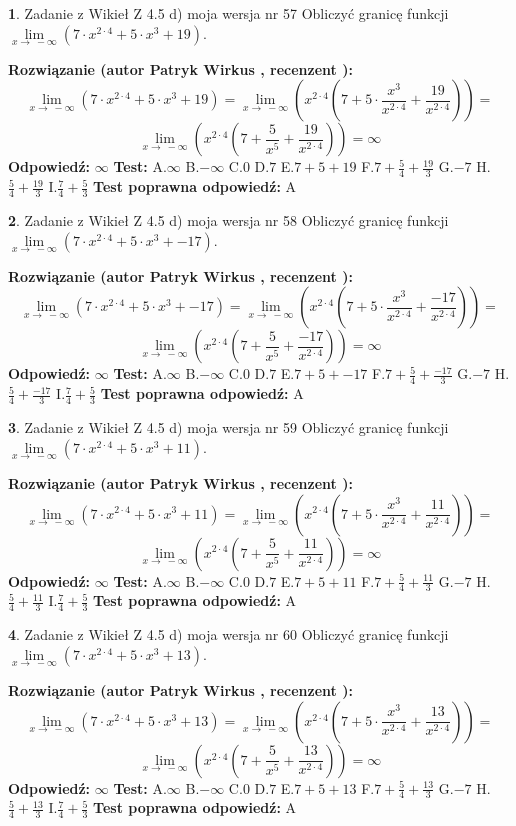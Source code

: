 \documentclass[12pt, a4paper]{article}
\theoremstyle{definition} %
\newtheorem{zad}{}
\newcommand{\zadStart}[1]{\begin{zad}#1\newline}
\newcommand{\zadStop}{\end{zad}}
\newcommand{\rozwStart}[2]{\noindent \textbf{Rozwiązanie (autor #1 , recenzent #2): }\newline}
\newcommand{\rozwStop}{\newline}
\newcommand{\odpStart}{\noindent \textbf{Odpowiedź:}\newline}
\newcommand{\odpStop}{\newline}
\newcommand{\testStart}{\noindent \textbf{Test:}\newline}
\newcommand{\testStop}{\newline}
\newcommand{\kluczStart}{\noindent \textbf{Test poprawna odpowiedź:}\newline}
\newcommand{\kluczStop}{\newline}
\begin{document}
\zadStart{Zadanie z Wikieł Z 4.5 d) moja wersja nr 57}
Obliczyć granicę funkcji  $\lim\limits_{x\to\ -\infty}(7 \cdot x^{2\cdot4}+5 \cdot x^{3}+19)$.
\zadStop
\rozwStart{Patryk Wirkus}{}
$$\lim\limits_{x\to\ -\infty}(7 \cdot x^{2\cdot4}+5 \cdot x^{3}+19) = \lim\limits_{x\to\ -\infty}(x^{2\cdot4}(7 +5 \cdot \frac{x^{3}}{x^{2\cdot4}}+\frac{19}{x^{2\cdot4}})) =$$ $$\lim\limits_{x\to\ -\infty}(x^{2\cdot4}(7 +\frac{5}{x^{5}}+\frac{19}{x^{2\cdot4}})) =\infty$$
\rozwStop
\odpStart
$\infty$
\odpStop
\testStart
A.$\infty$ B.$-\infty$ C.$0$ D.$7$ E.$7 + 5 + 19$
F.$7+\frac{5}{4}+\frac{19}{3}$ G.$-7$
H.$\frac{5}{4}+\frac{19}{3}$
I.$\frac{7}{4}+\frac{5}{3}$
\testStop
\kluczStart
A
\kluczStop



\zadStart{Zadanie z Wikieł Z 4.5 d) moja wersja nr 58}
Obliczyć granicę funkcji  $\lim\limits_{x\to\ -\infty}(7 \cdot x^{2\cdot4}+5 \cdot x^{3}+-17)$.
\zadStop
\rozwStart{Patryk Wirkus}{}
$$\lim\limits_{x\to\ -\infty}(7 \cdot x^{2\cdot4}+5 \cdot x^{3}+-17) = \lim\limits_{x\to\ -\infty}(x^{2\cdot4}(7 +5 \cdot \frac{x^{3}}{x^{2\cdot4}}+\frac{-17}{x^{2\cdot4}})) =$$ $$\lim\limits_{x\to\ -\infty}(x^{2\cdot4}(7 +\frac{5}{x^{5}}+\frac{-17}{x^{2\cdot4}})) =\infty$$
\rozwStop
\odpStart
$\infty$
\odpStop
\testStart
A.$\infty$ B.$-\infty$ C.$0$ D.$7$ E.$7 + 5 + -17$
F.$7+\frac{5}{4}+\frac{-17}{3}$ G.$-7$
H.$\frac{5}{4}+\frac{-17}{3}$
I.$\frac{7}{4}+\frac{5}{3}$
\testStop
\kluczStart
A
\kluczStop



\zadStart{Zadanie z Wikieł Z 4.5 d) moja wersja nr 59}
Obliczyć granicę funkcji  $\lim\limits_{x\to\ -\infty}(7 \cdot x^{2\cdot4}+5 \cdot x^{3}+11)$.
\zadStop
\rozwStart{Patryk Wirkus}{}
$$\lim\limits_{x\to\ -\infty}(7 \cdot x^{2\cdot4}+5 \cdot x^{3}+11) = \lim\limits_{x\to\ -\infty}(x^{2\cdot4}(7 +5 \cdot \frac{x^{3}}{x^{2\cdot4}}+\frac{11}{x^{2\cdot4}})) =$$ $$\lim\limits_{x\to\ -\infty}(x^{2\cdot4}(7 +\frac{5}{x^{5}}+\frac{11}{x^{2\cdot4}})) =\infty$$
\rozwStop
\odpStart
$\infty$
\odpStop
\testStart
A.$\infty$ B.$-\infty$ C.$0$ D.$7$ E.$7 + 5 + 11$
F.$7+\frac{5}{4}+\frac{11}{3}$ G.$-7$
H.$\frac{5}{4}+\frac{11}{3}$
I.$\frac{7}{4}+\frac{5}{3}$
\testStop
\kluczStart
A
\kluczStop



\zadStart{Zadanie z Wikieł Z 4.5 d) moja wersja nr 60}
Obliczyć granicę funkcji  $\lim\limits_{x\to\ -\infty}(7 \cdot x^{2\cdot4}+5 \cdot x^{3}+13)$.
\zadStop
\rozwStart{Patryk Wirkus}{}
$$\lim\limits_{x\to\ -\infty}(7 \cdot x^{2\cdot4}+5 \cdot x^{3}+13) = \lim\limits_{x\to\ -\infty}(x^{2\cdot4}(7 +5 \cdot \frac{x^{3}}{x^{2\cdot4}}+\frac{13}{x^{2\cdot4}})) =$$ $$\lim\limits_{x\to\ -\infty}(x^{2\cdot4}(7 +\frac{5}{x^{5}}+\frac{13}{x^{2\cdot4}})) =\infty$$
\rozwStop
\odpStart
$\infty$
\odpStop
\testStart
A.$\infty$ B.$-\infty$ C.$0$ D.$7$ E.$7 + 5 + 13$
F.$7+\frac{5}{4}+\frac{13}{3}$ G.$-7$
H.$\frac{5}{4}+\frac{13}{3}$
I.$\frac{7}{4}+\frac{5}{3}$
\testStop
\kluczStart
A
\kluczStop
\end{document}
